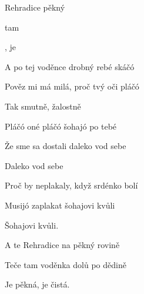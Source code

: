 

\zs
{} Rehradice  pěkný 

 tam    

, je 
\ks

\zs
A po tej voděnce drobný rebé skáčó

Pověz mi má milá, proč tvý oči pláčó

Tak smutně, žalostně
\ks

\zs
Pláčó oné pláčó šohajó po tebé

Že sme sa dostali daleko vod sebe

Daleko vod sebe
\ks

\zs
Proč by neplakaly, když srdénko bolí

Musijó zaplakat šohajovi kvůli

Šohajovi kvůli.
\ks

\zs
A te Rehradice na pěkný rovině

Teče tam voděnka dolů po dědině

Je pěkná, je čistá.
\ks

\kp























